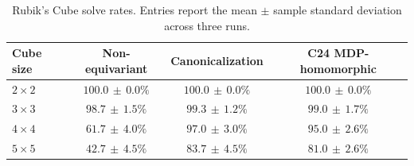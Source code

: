 \begin{table}[t]
  \centering
  \small
  \setlength{\tabcolsep}{5pt}
  \caption{Rubik's Cube solve rates. Entries report the mean $\pm$ sample standard deviation across three runs.}
  \label{tab:rubik-c24-illustrative}
  \begin{tabular}{lccc}
    \toprule
    Cube size & Non-equivariant & Canonicalization & C24 MDP-homomorphic \\
    \midrule
    $2\times2$ & $100.0\,\pm\,0.0\%$ & $100.0\,\pm\,0.0\%$ & $100.0\,\pm\,0.0\%$ \\
    $3\times3$ & $98.7\,\pm\,1.5\%$ & $99.3\,\pm\,1.2\%$ & $99.0\,\pm\,1.7\%$ \\
    $4\times4$ & $61.7\,\pm\,4.0\%$ & $97.0\,\pm\,3.0\%$ & $95.0\,\pm\,2.6\%$ \\
    $5\times5$ & $42.7\,\pm\,4.5\%$ & $83.7\,\pm\,4.5\%$ & $81.0\,\pm\,2.6\%$ \\
    \bottomrule
  \end{tabular}
\end{table}
